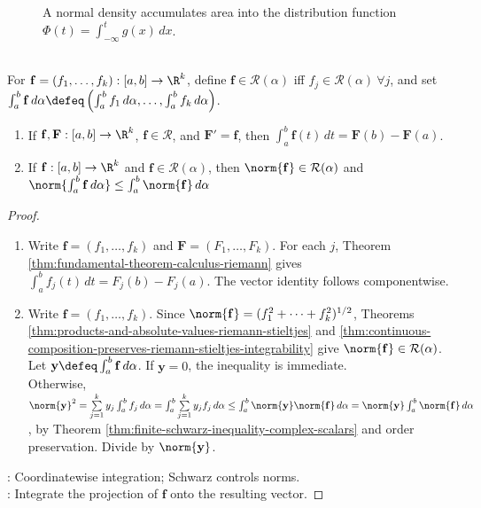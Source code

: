 \begin{figure}[H]
  \centering
  
  \caption{A normal density accumulates area into the distribution function $\Phi(t)=\int_{-\infty}^{t}g(x)\,dx$.}
  \label{fig:normal-distribution-cdf}
\end{figure}

\begin{definition} \label{def:vector-valued-riemann-stieltjes-integral} \\
For $\mathbf{f}=(f_1,\ldots,f_k):[a,b]\to\R^k$, define $\mathbf{f}\in\mathcal{R}(\alpha)$ iff $f_j\in\mathcal{R}(\alpha) \ \forall j$, and set $\int_a^b \mathbf{f}\,d\alpha \defeq \left(\int_a^b f_1\,d\alpha,\ldots,\int_a^b f_k\,d\alpha\right)$.
\end{definition}

\begin{theorem} \label{thm:vector-valued-integral-results} 
\begin{enumerate}[label=(\roman*)]
\setlength{\itemsep}{0pt}
\item If $\mathbf{f},\mathbf{F}:[a,b]\to\R^k$, $\mathbf{f}\in\mathcal{R}$, and $\mathbf{F}'=\mathbf{f}$, then $\int_a^b \mathbf{f}(t)\,dt=\mathbf{F}(b)-\mathbf{F}(a)$.
\item If $\mathbf{f}:[a,b]\to\R^k$ and $\mathbf{f}\in\mathcal{R}(\alpha)$, then $\norm{\mathbf{f}}\in\mathcal{R}(\alpha)$ and $\norm{\int_a^b \mathbf{f}\,d\alpha}\leq\int_a^b\norm{\mathbf{f}}\,d\alpha$
\end{enumerate}
\begin{proof}
\begin{enumerate}[label=(\roman*)]
\setlength{\itemsep}{0pt}
\item
Write $\mathbf{f}=(f_1,\ldots,f_k)$ and $\mathbf{F}=(F_1,\ldots,F_k)$. For each $j$, Theorem \ref{thm:fundamental-theorem-calculus-riemann} gives $\int_a^b f_j(t)\,dt=F_j(b)-F_j(a)$. The vector identity follows componentwise.
\item
Write $\mathbf{f}=(f_1,\ldots,f_k)$. Since $\norm{\mathbf{f}}=(f_1^2+\cdots+f_k^2)^{1/2}$, Theorems \ref{thm:products-and-absolute-values-riemann-stieltjes} and \ref{thm:continuous-composition-preserves-riemann-stieltjes-integrability} give $\norm{\mathbf{f}}\in\mathcal{R}(\alpha)$.\\
Let $\mathbf{y}\defeq\int_a^b\mathbf{f}\,d\alpha$. If $\mathbf{y}=0$, the inequality is immediate.\\
Otherwise, $\norm{\mathbf{y}}^2 =\sum\limits_{j=1}^{k}y_j\int_a^b f_j\,d\alpha =\int_a^b\sum\limits_{j=1}^{k}y_jf_j\,d\alpha \leq\int_a^b\norm{\mathbf{y}}\norm{\mathbf{f}}\,d\alpha =\norm{\mathbf{y}}\int_a^b\norm{\mathbf{f}}\,d\alpha$, by Theorem \ref{thm:finite-schwarz-inequality-complex-scalars} and order preservation. Divide by $\norm{\mathbf{y}}$.
\end{enumerate}
: Coordinatewise integration; Schwarz controls norms.\\
: Integrate the projection of $\mathbf{f}$ onto the resulting vector.
\end{proof}
\end{theorem}

